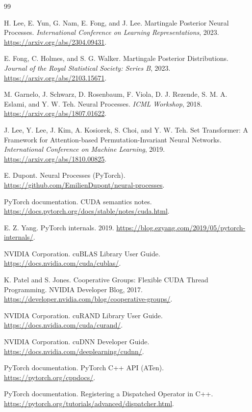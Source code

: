 \documentclass[11pt]{article}
\begin{document}
\begin{thebibliography}{99}
	\raggedright{}

	H. Lee, E. Yun, G. Nam, E. Fong, and J. Lee.
	\newblock{}Martingale Posterior Neural Processes.
	\newblock{}\emph{International Conference on Learning Representations}, 2023.
	\newblock{}\url{https://arxiv.org/abs/2304.09431}.

	E. Fong, C. Holmes, and S. G. Walker.
	\newblock{}Martingale Posterior Distributions.
	\newblock{}\emph{Journal of the Royal Statistical Society: Series B}, 2023.
	\newblock{}\url{https://arxiv.org/abs/2103.15671}.

	M. Garnelo, J. Schwarz, D. Rosenbaum, F. Viola, D. J. Rezende, S. M. A. Eslami,
	and Y. W. Teh.
	\newblock{}Neural Processes.
	\newblock{}\emph{ICML Workshop}, 2018.
	\newblock{}\url{https://arxiv.org/abs/1807.01622}.

	J. Lee, Y. Lee, J. Kim, A. Kosiorek, S. Choi, and Y. W. Teh.
	\newblock{}Set Transformer: A Framework for Attention-based Permutation-Invariant Neural Networks.
	\newblock{}\emph{International Conference on Machine Learning}, 2019.
	\newblock{}\url{https://arxiv.org/abs/1810.00825}.

	E. Dupont.
	\newblock{}Neural Processes (PyTorch).
	\newblock{}\url{https://github.com/EmilienDupont/neural-processes}.

	PyTorch documentation.
	\newblock{}CUDA semantics notes.
	\newblock{}\url{https://docs.pytorch.org/docs/stable/notes/cuda.html}.

	E. Z. Yang.
	\newblock{}PyTorch internals.
	\newblock{}2019.
	\newblock{}\url{https://blog.ezyang.com/2019/05/pytorch-internals/}.

	NVIDIA Corporation.
	\newblock{}cuBLAS Library User Guide.
	\newblock{}\url{https://docs.nvidia.com/cuda/cublas/}.

	K. Patel and S. Jones.
	\newblock{}Cooperative Groups: Flexible CUDA Thread Programming.
	\newblock{}NVIDIA Developer Blog, 2017.
	\newblock{}\url{https://developer.nvidia.com/blog/cooperative-groups/}.

	NVIDIA Corporation.
	\newblock{}cuRAND Library User Guide.
	\newblock{}\url{https://docs.nvidia.com/cuda/curand/}.

	NVIDIA Corporation.
	\newblock{}cuDNN Developer Guide.
	\newblock{}\url{https://docs.nvidia.com/deeplearning/cudnn/}.

	PyTorch documentation.
	\newblock{}PyTorch C++ API (ATen).
	\newblock{}\url{https://pytorch.org/cppdocs/}.

	PyTorch documentation.
	\newblock{}Registering a Dispatched Operator in C++.
	\newblock{}\url{https://pytorch.org/tutorials/advanced/dispatcher.html}.

\end{thebibliography}
\end{document}
